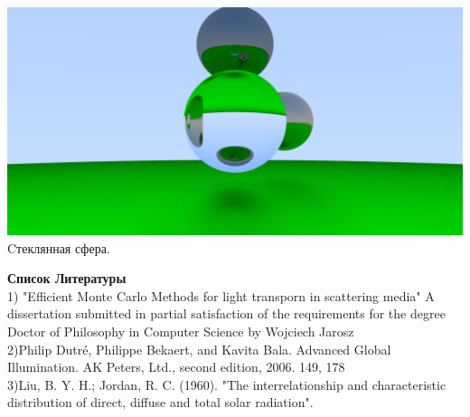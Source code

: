 \documentclass[titlepage]{article}
\begin{document}
\begin{center}
	\includegraphics[scale=0.2]{wtf.jpg}
	\\Cтеклянная сфера.
\end{center}
\newpage
\textbf{Список Литературы}
\\
1) "Efficient Monte Carlo Methods for light transporn in scattering media" A dissertation submitted in partial satisfaction of the
requirements for the degree
Doctor of Philosophy
in
Computer Science
by
Wojciech Jarosz
\\
2)Philip Dutré, Philippe Bekaert, and Kavita Bala. Advanced Global Illumination. AK Peters, Ltd.,
second edition, 2006. 149, 178\\
3)Liu, B. Y. H.; Jordan, R. C. (1960). "The interrelationship and characteristic distribution of direct, diffuse and total solar radiation".
\end{document}
